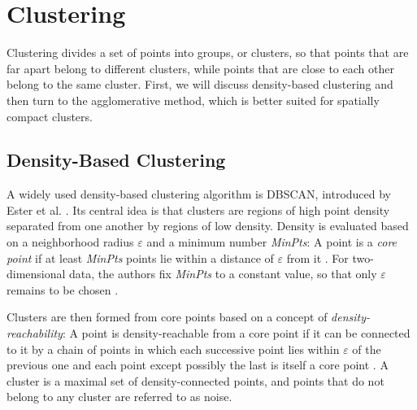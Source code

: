\documentclass[english, egger, bsc]{vcethesis}
\begin{document}
\section{Clustering}
\label{sec:clustering}
Clustering divides a set of points into groups, or clusters, so that points that are far apart belong to different clusters, while points that are close to each other belong to the same cluster. First, we will discuss density-based clustering and then turn to the agglomerative method, which is better suited for spatially compact clusters.

\subsection{Density-Based Clustering}
A widely used density-based clustering algorithm is DBSCAN, introduced by Ester et al. \cite{ester1996dbscan}. Its central idea is that clusters are regions of high point density separated from one another by regions of low density. Density is evaluated based on a neighborhood radius $\varepsilon$ and a minimum number \textit{MinPts}: A point is a \emph{core point} if at least \textit{MinPts} points lie within a distance of $\varepsilon$ from it \cite{ester1996dbscan}. For two-dimensional data, the authors fix \textit{MinPts} to a constant value, so that only $\varepsilon$ remains to be chosen \cite{ester1996dbscan}.

Clusters are then formed from core points based on a concept of \emph{density-reachability}: A point is density-reachable from a core point if it can be connected to it by a chain of points in which each successive point lies within $\varepsilon$ of the previous one and each point except possibly the last is itself a core point \cite{ester1996dbscan}. A cluster is a maximal set of density-connected points, and points that do not belong to any cluster are referred to as noise.
\end{document}
